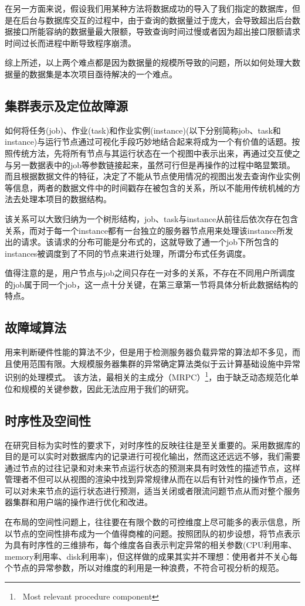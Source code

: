 在另一方面来说，假设我们用某种方法将数据成功的导入了我们指定的数据库，但是在后台与数据库交互的过程中，由于查询的数据量过于庞大，会导致超出后台数据接口所能容纳的数据量最大限额，导致查询时间过慢或者因为超出接口限额请求时间过长而进程中断导致程序崩溃。

综上所述，以上两个难点都是因为数据量的规模所导致的问题，所以如何处理大数据量的数据集是本次项目亟待解决的一个难点。
\subsection{集群表示及定位故障源}
如何将任务(job)、作业(task)和作业实例(instance)(以下分别简称job、task和instance)与运行节点通过可视化手段巧妙地结合起来将成为一个有价值的话题。按照传统方法，先将所有节点与其运行状态在一个视图中表示出来，再通过交互使之与另一数据表中的job等参数链接起来，虽然可行但是再操作的过程中略显繁琐。而且根据数据文件的特征，决定了不能从节点使用情况的视图出发去查询作业实例等信息，两者的数据文件中的时间戳存在被包含的关系，所以不能用传统机械的方法去处理本项目的数据结构。

该关系可以大致归纳为一个树形结构，job、task与instance从前往后依次存在包含关系，而对于每一个instance都有一台独立的服务器节点用来处理该instance所发出的请求。该请求的分布可能是分布式的，这就导致了通一个job下所包含的instances被调度到了不同的节点来进行处理，所谓分布式任务调度。

值得注意的是，用户节点与job之间只存在一对多的关系，不存在不同用户所调度的job属于同一个job，这一点十分关键，在第三章第一节将具体分析此数据结构的特点。
\subsection{故障域算法}
用来判断硬件性能的算法不少，但是用于检测服务器负载异常的算法却不多见，而且使用范围有限。大规模服务器集群的异常确定算法类似于云计算基础设施中异常识别的处理模式。 该方法，最相关的主成分（MRPC）\footnote{\ Most relevant procedure component}，由于缺乏动态规范化单位和规模的关键参数，因此无法应用于我们的研究。 
\subsection{时序性及空间性}
在研究目标为实时性的要求下，对时序性的反映往往是至关重要的。采用数据库的目的是可以实时对数据库内的记录进行可视化输出，然而这还远远不够，我们需要通过节点的过往记录和对未来节点运行状态的预测来具有时效性的描述节点，这样管理者不但可以从视图的渲染中找到异常规律从而在以后有针对性的操作节点，还可以对未来节点的运行状态进行预测，适当关闭或者限流问题节点从而对整个服务器集群和用户端的操作进行优化和改进。

在布局的空间性问题上，往往要在有限个数的可控维度上尽可能多的表示信息，所以节点的空间性排布成为一个值得商榷的问题。按照团队的初步设想，将节点表示为具有时序性的三维排布，每个维度各自表示判定异常的相关参数(CPU利用率、memory利用率、disk利用率)，但这样做的成果其实并不理想：使用者并不关心每个节点的异常参数，所以对维度的利用是一种浪费，不符合可视分析的规范。
